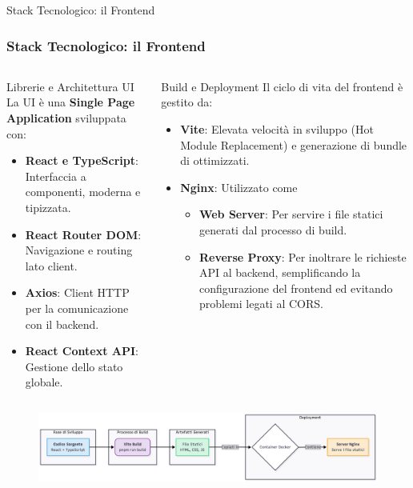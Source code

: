 \documentclass[8pt]{beamer}
\begin{document}
\begin{frame}{Stack Tecnologico: il Frontend}
  \frametitle{Stack Tecnologico: il Frontend}

  \begin{columns}[T]
    \begin{block}{Librerie e Architettura UI}
      La UI è una \textbf{Single Page Application} sviluppata con:
      \begin{itemize}
        \item[\large\faReact] \textbf{React e TypeScript}: Interfaccia a componenti, moderna e tipizzata.

        \item[\large\faRoute]  \textbf{React Router DOM}: Navigazione e routing lato client.

        \item[\large\faExchange*] \textbf{Axios}: Client HTTP per la comunicazione con il backend.

        \item[\large\faCogs] \textbf{React Context API}: Gestione dello stato globale.
      \end{itemize}
    \end{block}

    \begin{block}{Build e Deployment}
      Il ciclo di vita del frontend è gestito da:
      \begin{itemize}
        \item[\large\faBolt] \textbf{Vite}: Elevata velocità in sviluppo (Hot Module Replacement) e generazione di bundle di ottimizzati.
        \item[\large\faServer] \textbf{Nginx}: Utilizzato come
              \begin{itemize}
                \item \textbf{Web Server}: Per servire i file statici generati dal processo di build.
                \item \textbf{Reverse Proxy}: Per inoltrare le richieste API al backend, semplificando la configurazione del frontend ed evitando problemi legati al CORS.
              \end{itemize}
      \end{itemize}
    \end{block}
  \end{columns}

  \vfill %

  \begin{figure}
    \centering
    \includegraphics[width=\textwidth]{figures/frontend_stack.png}
  \end{figure}

\end{frame}
\end{document}
